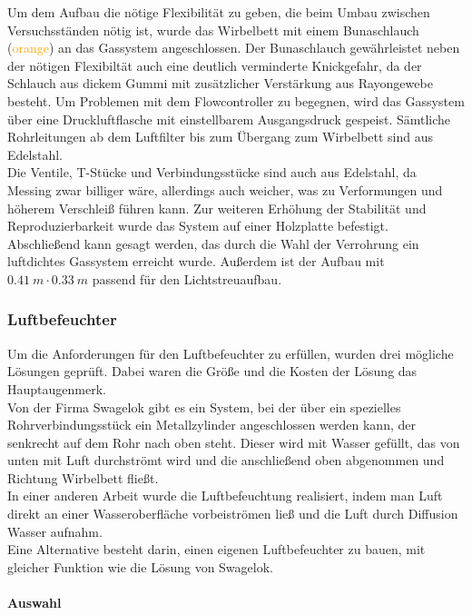 Um dem Aufbau die nötige Flexibilität zu geben, die beim Umbau zwischen Versuchsständen nötig ist, wurde das Wirbelbett mit einem Bunaschlauch (\textcolor{orange}{orange}) an das Gassystem angeschlossen. Der Bunaschlauch gewährleistet neben der nötigen Flexibiltät auch eine deutlich verminderte Knickgefahr, da der Schlauch aus dickem Gummi mit zusätzlicher Verstärkung aus Rayongewebe besteht.
Um Problemen mit dem Flowcontroller zu begegnen, wird das Gassystem über eine Druckluftflasche mit einstellbarem Ausgangsdruck gespeist. Sämtliche Rohrleitungen ab dem Luftfilter bis zum Übergang zum Wirbelbett sind aus Edelstahl. \\
Die Ventile, T-Stücke und Verbindungsstücke sind auch aus Edelstahl, da Messing zwar billiger wäre, allerdings auch weicher, was zu Verformungen und höherem Verschleiß führen kann. Zur weiteren Erhöhung der Stabilität und Reproduzierbarkeit wurde das System auf einer Holzplatte befestigt. \\
Abschließend kann gesagt werden, das durch die Wahl der Verrohrung ein luftdichtes Gassystem erreicht wurde. Außerdem ist der Aufbau mit $\SI{0,41}{m} \cdot \SI{0,33}{m}$ passend für den Lichtstreuaufbau.


\subsubsection{Luftbefeuchter}

Um die Anforderungen für den Luftbefeuchter zu erfüllen, wurden drei mögliche Lösungen geprüft. Dabei waren die Größe und die Kosten der Lösung das Hauptaugenmerk. \\
Von der Firma Swagelok gibt es ein System, bei der über ein spezielles Rohrverbindungsstück ein Metallzylinder angeschlossen werden kann, der senkrecht auf dem Rohr nach oben steht. Dieser wird mit Wasser gefüllt, das von unten mit Luft durchströmt wird und die anschließend oben abgenommen und Richtung Wirbelbett fließt. \\
In einer anderen Arbeit \cite{Fallturmexperiment} wurde die Luftbefeuchtung realisiert, indem man Luft direkt an einer  Wasseroberfläche vorbeiströmen ließ und die Luft durch Diffusion Wasser aufnahm. \\
Eine Alternative besteht darin, einen eigenen Luftbefeuchter zu bauen, mit gleicher Funktion wie die Lösung von Swagelok. 


\paragraph{Auswahl}

